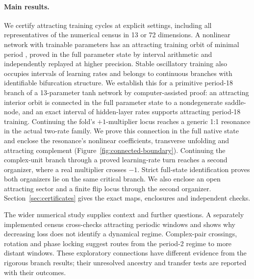 \documentclass[11pt,letterpaper]{article}
\begin{document}
\paragraph{Main results.} We certify attracting training cycles at \nCertifiedOrbits{} explicit settings,
including all \nCensusAll{} representatives of the numerical census in 13 or 72 dimensions. A nonlinear network with \nPFiftyEightDimension{} trainable parameters has an attracting training orbit of minimal period \nPFiftyEightPeriod{}, proved in the full parameter state by interval arithmetic and independently replayed at higher precision. Stable oscillatory training also occupies intervals of learning rates and belongs to
continuous branches with identifiable bifurcation structure. We establish this for a primitive period-18 branch
of a 13-parameter tanh network by computer-assisted proof: an attracting interior orbit is connected in the
full parameter state to a nondegenerate saddle-node, and an exact interval of hidden-layer rates supports
attracting period-18 training. Continuing the fold's $+1$-multiplier locus reaches a generic 1:1 resonance
in the actual two-rate family. We prove this connection in the full native state and enclose the resonance's
nonlinear coefficients, transverse unfolding and attracting complement (Figure~\ref{fig:connected-boundary}).
Continuing the complex-unit branch through a proved learning-rate turn reaches a second organizer,
where a real multiplier crosses $-1$. Strict full-state identification proves both organizers lie
on the same critical branch. We also enclose an open attracting sector and a finite
flip locus through the second organizer.
Section~\ref{sec:certificates} gives the exact maps, enclosures and independent checks.

The wider numerical study supplies context and further questions. A separately implemented census
cross-checks attracting periodic windows and shows why decreasing loss does not identify a dynamical regime.
Complex-pair crossings, rotation and phase locking suggest routes from the period-2 regime to more distant
windows. These exploratory connections have different evidence from the rigorous branch results;
their unresolved ancestry and transfer tests are reported with their outcomes.
\end{document}
